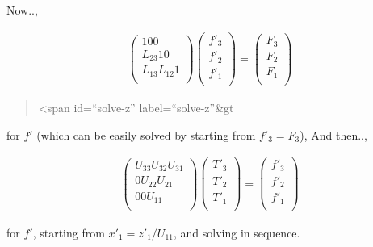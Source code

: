 Now..,

\begin{eqnarray}
  \left( \begin{array}{lll}
         1       0       0      \\
         L_{23}  1       0      \\
         L_{13}  L_{12}  1      \\
         \end{array} \right)
  \left( \begin{array}{l}
         f'_3 \\ f'_2 \\ f'_1 \\
         \end{array} \right)
  =
  \left(  \begin{array}{l}
          F_3 \\ F_2 \\ F_1 \\
          \end{array} \right)
\end{eqnarray}

\begin{quote}
\textless span id=``solve-z'' label=``solve-z''\&gt
\end{quote}

for \(f'\) (which can be easily solved by starting from \(f'_3=F_3\)),
And then..,

\begin{eqnarray}
  \left( \begin{array}{lll}
         U_{33}  U_{32}  U_{31} \\
         0       U_{22}  U_{21} \\
         0       0       U_{11} \\
         \end{array} \right)
  \left( \begin{array}{l}
         T'_3 \\ T'_2 \\ T'_1 \\
         \end{array} \right)
  =
  \left(  \begin{array}{l}
          f'_3 \\ f'_2 \\ f'_1 \\
          \end{array} \right)
\end{eqnarray}

for \(f'\), starting from \(x'_1=z'_1/U_{11}\), and solving in sequence.

